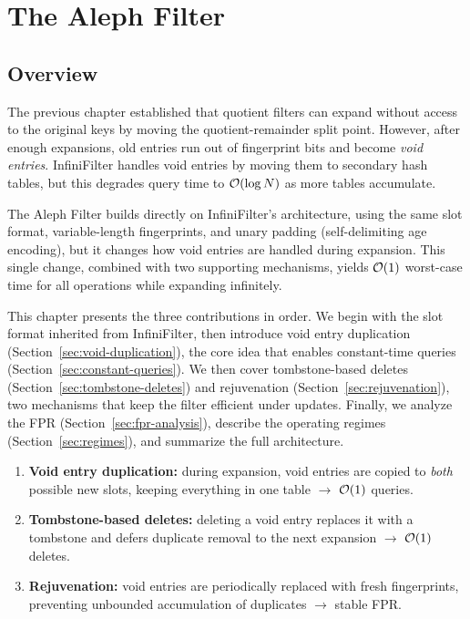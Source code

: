 \chapter{The Aleph Filter}

\section{Overview}

The previous chapter established that quotient filters can expand 
without access to the original keys by moving the quotient-remainder 
split point. However, after enough expansions, old entries run out of 
fingerprint bits and become \emph{void entries}. InfiniFilter 
\cite{infinifilter} handles void entries by moving them to secondary 
hash tables, but this degrades query time to $\mathcal{O}(\log N)$ as more 
tables accumulate.

The Aleph Filter \cite{aleph} builds directly on InfiniFilter's 
architecture, using the same slot format, variable-length fingerprints, 
and unary padding (self-delimiting age encoding), but it changes how void entries are handled during 
expansion. This single change, combined with two supporting mechanisms, 
yields $\mathcal{O}(1)$ worst-case time for all operations while expanding 
infinitely.

This chapter presents the three contributions in order. We begin with 
the slot format inherited from InfiniFilter, then introduce void 
entry duplication (Section~\ref{sec:void-duplication}), 
the core idea that enables constant-time queries 
(Section~\ref{sec:constant-queries}). We then cover tombstone-based 
deletes (Section~\ref{sec:tombstone-deletes}) and rejuvenation 
(Section~\ref{sec:rejuvenation}), two mechanisms that keep the filter 
efficient under updates. Finally, we analyze the FPR 
(Section~\ref{sec:fpr-analysis}), describe the operating regimes 
(Section~\ref{sec:regimes}), and summarize the full architecture.


\begin{insightbox}
\begin{enumerate}
  \item \textbf{Void entry duplication:} during expansion, void 
        entries are copied to \emph{both} possible new slots, keeping 
        everything in one table $\rightarrow$ $\mathcal{O}(1)$ queries.
  \item \textbf{Tombstone-based deletes:} deleting a void entry 
        replaces it with a tombstone and defers duplicate removal to 
        the next expansion $\rightarrow$ $\mathcal{O}(1)$ deletes.
  \item \textbf{Rejuvenation:} void entries are periodically replaced 
        with fresh fingerprints, preventing unbounded accumulation of 
        duplicates $\rightarrow$ stable FPR.
\end{enumerate}
\end{insightbox}


